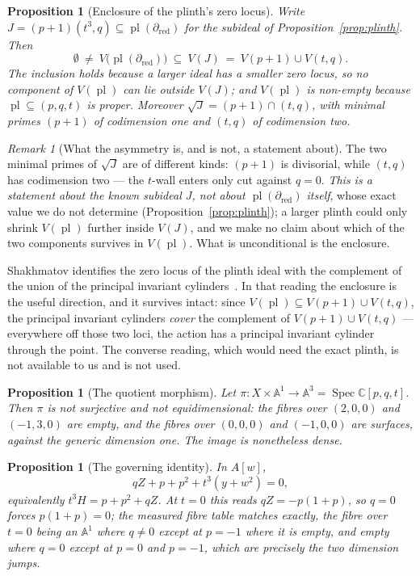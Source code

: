 \documentclass[11pt]{article}
\newtheorem{proposition}[theorem]{Proposition}
\theoremstyle{definition}
\theoremstyle{remark}
\newtheorem{remark}[theorem]{Remark}
\newcommand{\C}{\mathbb{C}}
\newcommand{\Aff}[1]{\mathbb{A}^{#1}}
\newcommand{\pl}{\operatorname{pl}}
\newcommand{\Spec}{\operatorname{Spec}}
\begin{document}
\begin{proposition}[Enclosure of the plinth's zero locus]\label{prop:walls}
Write $J=(p+1)(t^3,q)\subseteq\pl(\partial_{\mathrm{red}})$ for the subideal of
Proposition~\ref{prop:plinth}. Then
\[
\emptyset\ \ne\ V\bigl(\pl(\partial_{\mathrm{red}})\bigr)\ \subseteq\ V(J)
\ =\ V(p+1)\cup V(t,q).
\]
The inclusion holds because a larger ideal has a smaller zero locus, so no
component of $V(\pl)$ can lie outside $V(J)$; and $V(\pl)$ is non-empty
because $\pl\subseteq(p,q,t)$ is proper. Moreover $\sqrt{J}=(p+1)\cap(t,q)$,
with minimal primes $(p+1)$ of codimension one and $(t,q)$ of codimension two.
\end{proposition}

\begin{remark}[What the asymmetry is, and is not, a statement about]
\label{rem:asymmetry}
The two minimal primes of $\sqrt{J}$ are of different kinds: $(p+1)$ is
divisorial, while $(t,q)$ has codimension two --- the $t$-wall enters only cut
against $q=0$. \emph{This is a statement about the known subideal $J$, not
about $\pl(\partial_{\mathrm{red}})$ itself}, whose exact value we do not
determine (Proposition~\ref{prop:plinth}); a larger plinth could only shrink
$V(\pl)$ further inside $V(J)$, and we make no claim about which of the two
components survives in $V(\pl)$. What is unconditional is the enclosure.
\end{remark}

Shakhmatov identifies the zero locus of the plinth ideal with the complement
of the union of the principal invariant cylinders~\cite{Shakhmatov2026}. In
that reading the enclosure is the useful direction, and it survives intact:
since $V(\pl)\subseteq V(p+1)\cup V(t,q)$, the principal invariant cylinders
\emph{cover} the complement of $V(p+1)\cup V(t,q)$ --- everywhere off those two
loci, the action has a principal invariant cylinder through the point. The
converse reading, which would need the exact plinth, is not available to us
and is not used.

\begin{proposition}[The quotient morphism]\label{prop:quotient}
Let $\pi\colon X\times\Aff{1}\to\Aff{3}=\Spec\C[p,q,t]$. Then $\pi$ is
\emph{not surjective} and \emph{not equidimensional}: the fibres over
$(2,0,0)$ and $(-1,3,0)$ are empty, and the fibres over $(0,0,0)$ and
$(-1,0,0)$ are surfaces, against the generic dimension one. The image is
nonetheless dense.
\end{proposition}

\begin{proposition}[The governing identity]\label{prop:governing}
In $A[w]$,
\begin{equation}\label{eq:governing}
qZ+p+p^2+t^3(y+w^2)=0,
\end{equation}
equivalently $t^3H=p+p^2+qZ$. At $t=0$ this reads $qZ=-p(1+p)$, so $q=0$
forces $p(1+p)=0$; the measured fibre table matches exactly, the fibre over
$t=0$ being an $\Aff{1}$ where $q\ne0$ except at $p=-1$ where it is empty, and
empty where $q=0$ except at $p=0$ and $p=-1$, which are precisely the two
dimension jumps.
\end{proposition}
\end{document}
